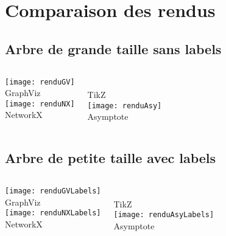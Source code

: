 \section{Comparaison des rendus}

\subsection{Arbre de grande taille sans labels}
\begin{frame}
\begin{columns}[t]
\centering
\texttt{[image: renduGV]}\\ %
GraphViz \\
\texttt{[image: renduNX]}\\
NetworkX %
\centering
{}\\ %
TikZ\\
\texttt{[image: renduAsy]}\\ %
Asymptote
\end{columns}
\end{frame}

\subsection{Arbre de petite taille avec labels}
\begin{frame}
\begin{columns}[t]
\centering
\texttt{[image: renduGVLabels]}\\ %
GraphViz\\
\texttt{[image: renduNXLabels]}\\ %
NetworkX
\centering
{}\\ %
TikZ\\
\texttt{[image: renduAsyLabels]}\\ %
Asymptote
\end{columns}
\end{frame}